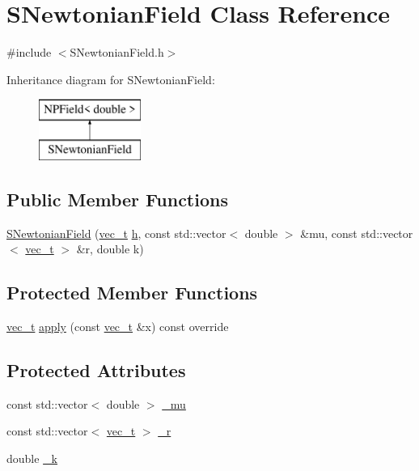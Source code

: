 \hypertarget{class_s_newtonian_field}{}\section{S\+Newtonian\+Field Class Reference}
\label{class_s_newtonian_field}


{\ttfamily \#include $<$S\+Newtonian\+Field.\+h$>$}

Inheritance diagram for S\+Newtonian\+Field\+:\begin{figure}[H]
\begin{center}
\leavevmode
\includegraphics[height=2.000000cm]{class_s_newtonian_field}
\end{center}
\end{figure}
\subsection*{Public Member Functions}
\begin{DoxyCompactItemize}
\item 
\mbox{\hyperlink{class_s_newtonian_field_a3e0816f9bbfd74f70b881562a0d590b5}{S\+Newtonian\+Field}} (\mbox{\hyperlink{_n_vector_8h_a0a2cfc67e738a3d73e4f12098c4c07f6}{vec\+\_\+t}} \mbox{\hyperlink{class_n_p_field_a21a56864db47d8589ec917764e3b2b85}{h}}, const std\+::vector$<$ double $>$ \&mu, const std\+::vector$<$ \mbox{\hyperlink{_n_vector_8h_a0a2cfc67e738a3d73e4f12098c4c07f6}{vec\+\_\+t}} $>$ \&r, double k)
\end{DoxyCompactItemize}
\subsection*{Protected Member Functions}
\begin{DoxyCompactItemize}
\item 
\mbox{\hyperlink{_n_vector_8h_a0a2cfc67e738a3d73e4f12098c4c07f6}{vec\+\_\+t}} \mbox{\hyperlink{class_s_newtonian_field_a1f42f77de6b77085a6a5f018fe44d41e}{apply}} (const \mbox{\hyperlink{_n_vector_8h_a0a2cfc67e738a3d73e4f12098c4c07f6}{vec\+\_\+t}} \&x) const override
\end{DoxyCompactItemize}
\subsection*{Protected Attributes}
\begin{DoxyCompactItemize}
\item 
const std\+::vector$<$ double $>$ \mbox{\hyperlink{class_s_newtonian_field_a2f447c353aa350e8e06f1167077a6577}{\+\_\+mu}}
\item 
const std\+::vector$<$ \mbox{\hyperlink{_n_vector_8h_a0a2cfc67e738a3d73e4f12098c4c07f6}{vec\+\_\+t}} $>$ \mbox{\hyperlink{class_s_newtonian_field_ae905751c50bc53c9c9ad020d5d0b68b1}{\+\_\+r}}
\item 
double \mbox{\hyperlink{class_s_newtonian_field_a6d87be6a91cbdd8b70890b00aac87127}{\+\_\+k}}
\end{DoxyCompactItemize}
